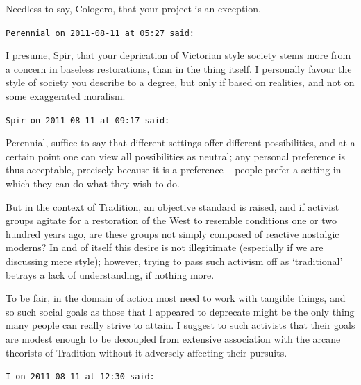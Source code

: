 \begin{footnotesize}
\begin{sffamily}
Needless to say, Cologero, that your project is an exception.

\hfill

\texttt{Perennial on 2011-08-11 at 05:27 said:}

I presume, Spir, that your deprication of Victorian style society stems more from a concern in baseless restorations, than in the thing itself. I personally favour the style of society you describe to a degree, but only if based on realities, and not on some exaggerated moralism.

\hfill

\texttt{Spir on 2011-08-11 at 09:17 said:}

Perennial, suffice to say that different settings offer different possibilities, and at a certain point one can view all possibilities as neutral; any personal preference is thus acceptable, precisely because it is a preference -- people prefer a setting in which they can do what they wish to do.

But in the context of Tradition, an objective standard is raised, and if activist groups agitate for a restoration of the West to resemble conditions one or two hundred years ago, are these groups not simply composed of reactive nostalgic moderns? In and of itself this desire is not illegitimate (especially if we are discussing mere style); however, trying to pass such activism off as `traditional' betrays a lack of understanding, if nothing more.

To be fair, in the domain of action most need to work with tangible things, and so such social goals as those that I appeared to deprecate might be the only thing many people can really strive to attain. I suggest to such activists that their goals are modest enough to be decoupled from extensive association with the arcane theorists of Tradition without it adversely affecting their pursuits.

\hfill

\texttt{I on 2011-08-11 at 12:30 said:}


\end{sffamily}
\end{footnotesize}
